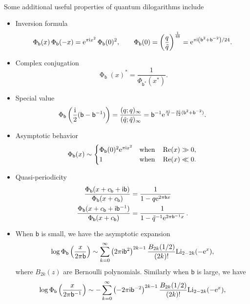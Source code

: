 \documentclass[a4paper,11pt]{article}
\theoremstyle{definition}
\newcommand{\re}{{\rm e}}
\newcommand{\ri}{{\rm i}}
\newcommand{\im}{\mathsf{i}}
\def\tq{{\tilde{q}}}
\newcommand{\mb}{\mathsf{b}}
\newcommand{\bb}{\mathsf{b}}
\newcommand{\fad}{\operatorname{\Phi}_{\mathsf{b}}}
\DeclareMathOperator{\real}{Re}
\begin{document}
Some additional useful properties of quantum dilogarithms include
\begin{itemize}
\item Inversion formula
  \begin{equation}
    \label{inversion}
    \fad(x) \fad(-x)=\re^{\pi \im x^2} \fad(0)^2, 
    \qquad
    \fad(0)=\left(\frac{q}{\tilde q}\right)^{\frac{1}{48}} =\re^{\pi\im\left(\mathsf{b}^2+\mathsf{b}^{-2}\right)/24}.
  \end{equation}
\item Complex conjugation
  \begin{equation}
    \fad(x)^* = \frac{1}{\Phi_{\bb^*}(x^*)}.
  \end{equation}
\item Special value
  \begin{equation}
    \fad\left(\frac{\ri}{2}(\bb-\bb^{-1})\right) =
    \frac{(q;q)_\infty}{(\tq;\tq)_\infty}
    =\bb^{-1}\re^{\frac{\pi\ri}{4}-\frac{\pi\ri}{12}(\bb^2+\bb^{-2})}.
  \end{equation}
\item Asymptotic behavior
  \begin{equation}
    \label{eq.as}
    \fad(x) \sim \begin{cases}
      \fad(0)^2\re^{\pi \im x^2} & \text{when} \quad \real(x) \gg 0, \\
      1             & \text{when} \quad \real(x) \ll 0.
    \end{cases}
  \end{equation}
\item Quasi-periodicity
  \begin{subequations}
    \begin{align}
      \label{eq.bshift}
      \frac{\fad(x+c_{\mathsf{b}}+\im \mathsf{b})}{
      \fad(x+c_{\mathsf{b}})} 
      &= \frac{1}{1-q \re^{2 \pi \mathsf{b} x}} 
      \\ 
      \label{eq.tbshift}
      \frac{\fad(x+c_{\mathsf{b}}+\im\mathsf{b}^{-1})}{
      \fad(x+c_{\mathsf{b}})}
      &= 
        \frac{1}{1-\tq^{-1} \re^{2 \pi \mathsf{b}^{-1} x}} \,.
    \end{align}
  \end{subequations}
\item When $\bb$ is small, we have the asymptotic expansion
  \begin{equation}\label{as-fd}
    \log \fad\left( {x \over 2 \pi \mb} \right) \sim
    \sum_{k=0}^\infty \left( 2 \pi \im \mb^2 \right)^{2k-1}
    {B_{2k}(1/2) \over (2k)!} {\rm Li}_{2-2k}(-\re^x), 
  \end{equation}
  where $B_{2k}(z)$ are Bernoulli polynomials.  Similarly when $\bb$
  is large, we have
  \begin{equation}\label{as-fd2}
    \log \fad\left( {x \over 2 \pi \mb^{-1}} \right) \sim
    -\sum_{k=0}^\infty \left( -2 \pi \im \mb^{-2} \right)^{2k-1}
    {B_{2k}(1/2) \over (2k)!} {\rm Li}_{2-2k}(-\re^x), 
  \end{equation}
\end{itemize}
\end{document}
